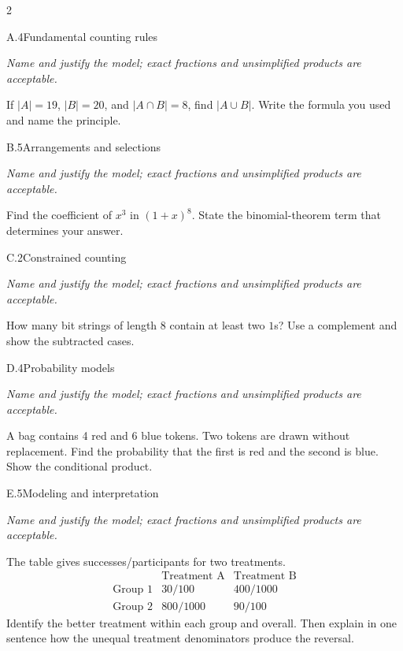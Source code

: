 \documentclass[9pt]{extarticle}
\begin{document}
\begin{multicols}{2}
\begin{CoreProblem}{A.4}{Fundamental counting rules}
{\scriptsize\textit{Name and justify the model; exact fractions and unsimplified products are acceptable.}\par}
If $|A|=19$, $|B|=20$, and $|A\cap B|=8$, find $|A\cup B|$. Write
    the formula you used and name the principle.
\end{CoreProblem}
\begin{CoreProblem}{B.5}{Arrangements and selections}
{\scriptsize\textit{Name and justify the model; exact fractions and unsimplified products are acceptable.}\par}
Find the coefficient of $x^3$ in $(1+x)^8$. State the binomial-theorem
    term that determines your answer.
\end{CoreProblem}
\begin{CoreProblem}{C.2}{Constrained counting}
{\scriptsize\textit{Name and justify the model; exact fractions and unsimplified products are acceptable.}\par}
How many bit strings of length 8 contain at least two $1$s? Use a
    complement and show the subtracted cases.
\end{CoreProblem}
\columnbreak
\begin{CoreProblem}{D.4}{Probability models}
{\scriptsize\textit{Name and justify the model; exact fractions and unsimplified products are acceptable.}\par}
A bag contains 4 red and 6 blue tokens. Two tokens are drawn without
    replacement. Find the probability that the first is red and the second is
    blue. Show the conditional product.
\end{CoreProblem}
\begin{CoreProblem}{E.5}{Modeling and interpretation}
{\scriptsize\textit{Name and justify the model; exact fractions and unsimplified products are acceptable.}\par}
The table gives successes/participants for two treatments.
    \[
    \begin{array}{c|cc}
      &\text{Treatment A}&\text{Treatment B}\\\hline
      \text{Group 1}&30/100&400/1000\\
      \text{Group 2}&800/1000&90/100
    \end{array}
    \]
    Identify the better treatment within each group and overall. Then explain in
    one sentence how the unequal treatment denominators produce the reversal.
\end{CoreProblem}
\end{multicols}
\end{document}
